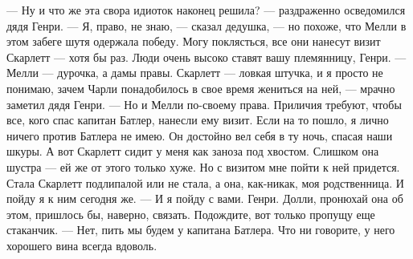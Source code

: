 — Ну и что же эта свора идиоток наконец решила? — раздраженно осведомился дядя Генри.
— Я, право, не знаю, — сказал дедушка, — но похоже, что Мелли в этом забеге шутя одержала победу. Могу поклясться, все они нанесут визит Скарлетт — хотя бы раз. Люди очень высоко ставят вашу племянницу, Генри.
— Мелли — дурочка, а дамы правы. Скарлетт — ловкая штучка, и я просто не понимаю, зачем Чарли понадобилось в свое время жениться на ней, — мрачно заметил дядя Генри. — Но и Мелли по-своему права. Приличия требуют, чтобы все, кого спас капитан Батлер, нанесли ему визит. Если на то пошло, я лично ничего против Батлера не имею. Он достойно вел себя в ту ночь, спасая наши шкуры. А вот Скарлетт сидит у меня как заноза под хвостом. Слишком она шустра — ей же от этого только хуже. Но с визитом мне пойти к ней придется. Стала Скарлетт подлипалой или не стала, а она, как-никак, моя родственница. И пойду я к ним сегодня же.
— И я пойду с вами. Генри. Долли, пронюхай она об этом, пришлось бы, наверно, связать. Подождите, вот только пропущу еще стаканчик.
— Нет, пить мы будем у капитана Батлера. Что ни говорите, у него хорошего вина всегда вдоволь.




